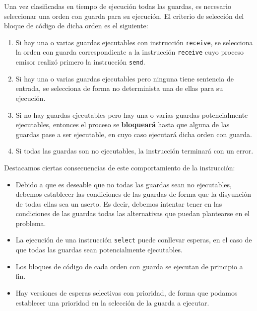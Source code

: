 Una vez clasificadas en tiempo de ejecución todas las guardas, es necesario seleccionar una orden con guarda para su ejecución. El criterio de selección del bloque de código de dicha orden es el siguiente:
\begin{enumerate}
    \item Si hay una o varias guardas ejecutables con instrucción \verb|receive|, se selecciona la orden con guarda correspondiente a la instrucción \verb|receive| cuyo proceso emisor realizó primero la instrucción \verb|send|.
    \item Si hay una o varias guardas ejecutables pero ninguna tiene sentencia de entrada, se selecciona de forma no determinista una de ellas para su ejecución.
    \item Si no hay guardas ejecutables pero hay una o varias guardas potencialmente ejecutables, entonces el proceso se \textbf{bloqueará} hasta que alguna de las guardas pase a ser ejecutable, en cuyo caso ejecutará dicha orden con guarda.
    \item Si todas las guardas son no ejecutables, la instrucción terminará con un error.
\end{enumerate}
Destacamos ciertas consecuencias de este comportamiento de la instrucción:
\begin{itemize}
    \item Debido a que es deseable que no todas las guardas sean no ejecutables, debemos establecer las condiciones de las guardas de forma que la disyunción de todas ellas sea un aserto. Es decir, debemos intentar tener en las condiciones de las guardas todas las alternativas que puedan plantearse en el problema.
    \item La ejecución de una instrucción \verb|select| puede conllevar esperas, en el caso de que todas las guardas sean potencialmente ejecutables.
    \item Los bloques de código de cada orden con guarda se ejecutan de principio a fin.
    \item Hay versiones de esperas selectivas con prioridad, de forma que podamos establecer una prioridad en la selección de la guarda a ejecutar.
\end{itemize}

